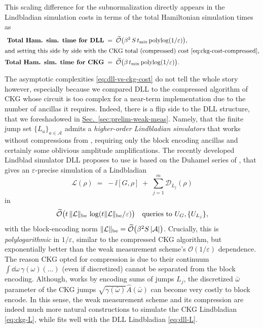 This scaling difference for the subnormalization directly appears in the Lindbladian simulation costs in terms of the total Hamiltonian simulation times as \cite[Thm. 19]{ding2025efficient}
\begin{align} \label{eq:dll-vs-ckg-cost}
\textbf{Total Ham. sim. time for DLL} &\;=\; \widetilde{\mathcal{O}}\bigl(\beta^2\,S\,t_\text{mix}\,\textup{polylog}(1/\varepsilon)\bigr), \\
\intertext{and setting this side by side with the CKG total (compressed) cost \eqref{eq:ckg-cost-compressed},}
\textbf{Total Ham. sim. time for CKG} &\;=\; \widetilde{\mathcal{O}}\bigl(\beta\,t_\text{mix}\,\textup{polylog}(1/\varepsilon)\bigr).
\end{align}

The asymptotic complexities \eqref{eq:dll-vs-ckg-cost} do not tell the whole story however, especially because we compared DLL to the compressed algorithm of CKG \cite[Thm.~III.2]{chen2023quantum} whose circuit is too complex for a near-term implementation due to the number of ancillas it requires. Indeed, there is a flip side to the DLL structure, that we foreshadowed in \hyperref[sec:prelim-weak-meas]{Sec.~\ref*{sec:prelim-weak-meas}}. Namely, that the finite jump set $\{L_a\}_{a\in\mathcal{A}}$ admits a \emph{higher-order Lindbladian simulators} that works without compressions from \cite{cleve2016efficient}, requiring only the block encoding ancillas and certainly some oblivious amplitude amplifications. The recently developed Lindblad simulator DLL proposes to use is based on the Duhamel series of \cite[Thm. 11]{li2022simulating}, that gives an $\varepsilon$-precise simulation of a Lindbladian 
$$
\mathcal{L}(\rho) \;=\; -\ii[G,\rho] \;+\; \sum_{j=1}^{m}\mathcal{D}_{L_j}(\rho)
$$
in 
$$
\widetilde{\mathcal{O}}\bigl(t\,\|\mathcal{L}\|_\textup{be}\,\log(t\|\mathcal{L}\|_\textup{be}/\varepsilon)\bigr) \quad\text{queries to } U_G, \{U_{L_j}\},
$$
with the block-encoding norm $\|\mathcal{L}\|_\textup{be} = \widetilde{\mathcal{O}}\bigl(\beta^2 S\,|\mathcal{A}|\bigr)$. Crucially, this is \emph{polylogarithmic} in $1/\varepsilon$, similar to the compressed CKG algorithm, but exponentially better than the weak measurement scheme's $\mathcal{O}(1 / \varepsilon)$ dependence. The reason CKG opted for compression is due to their continuum $\int\dd\omega\,\gamma(\omega)(\ldots)$ (even if discretized) cannot be separated from the block encoding. Although, \cite{li2022simulating} works by encoding sums of jumps $L_j$, the discretized $\bar{\omega}$ parameter of the CKG jumps $\sqrt{\gamma(\bar{\omega})} \hat{A}(\bar{\omega})$ can become very costly to block encode. In this sense, the weak measurement scheme and its compression are indeed much more natural constructions to simulate the CKG Lindbladian \eqref{eq:ckg-L}, while \cite{li2022simulating} fits well with the DLL Lindbladian \eqref{eq:dll-L}.